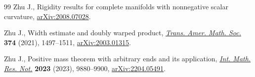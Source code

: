 \begin{thebibliography}{99}
Zhu J., Rigidity results for complete manifolds with nonnegative scalar
  curvature, \href{https://arxiv.org/abs/2008.07028}{arXiv:2008.07028}.

Zhu J., Width estimate and doubly warped product, \href{https://doi.org/10.1090/tran/8263}{\textit{Trans. Amer. Math.
  Soc.}} \textbf{374} (2021), 1497--1511, \href{https://arxiv.org/abs/2003.01315}{arXiv:2003.01315}.

Zhu J., Positive mass theorem with arbitrary ends and its application,
  \href{https://doi.org/10.1093/imrn/rnac117}{\textit{Int. Math. Res. Not.}} \textbf{2023} (2023), 9880--9900,
  \href{https://arxiv.org/abs/2204.05491}{arXiv:2204.05491}.

\end{thebibliography}
